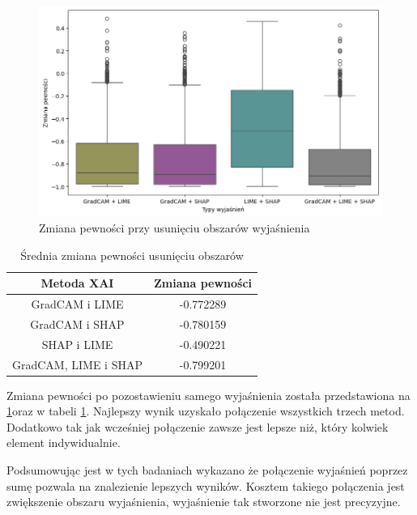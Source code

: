 \begin{figure}[h]
	\centering\includegraphics[width=.9\textwidth]{img/combine_confidence_no_exp_or}
	\caption{Zmiana pewności przy usunięciu obszarów wyjaśnienia}  \label{rys:combineandconfidenceorno}
\end{figure}
\begin{table}[h]
	\centering
	\begin{tabular}{|c|c|}
		\hline
		\textbf{Metoda XAI}  & Zmiana pewności \\
		\hline
		GradCAM i LIME       & -0.772289       \\
		\hline
		GradCAM i SHAP       & -0.780159       \\
		\hline
		SHAP i LIME          & -0.490221       \\
		\hline
		GradCAM, LIME i SHAP & -0.799201       \\
		\hline
	\end{tabular}
	\caption{Średnia zmiana pewności usunięciu obszarów}
	\label{tab:combineandconfidenceorno}
\end{table}
Zmiana pewności po pozostawieniu samego wyjaśnienia została przedstawiona na \ref{rys:combineandconfidenceorno}oraz w tabeli \ref{tab:combineandconfidenceorno}.
Najlepszy wynik uzyskało połączenie wszystkich trzech metod.
Dodatkowo tak jak wcześniej połączenie zawsze jest lepsze niż, który kolwiek element indywidualnie.

\vspace{1cm}
Podsumowując jest w tych badaniach wykazano że połączenie wyjaśnień poprzez sumę pozwala na znalezienie lepszych wyników.
Kosztem takiego połączenia jest zwiększenie obszaru wyjaśnienia, wyjaśnienie tak stworzone nie jest precyzyjne.

